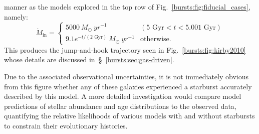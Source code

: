 manner as the models explored in the top row of Fig.~\ref{bursts:fig:fiducial_cases}, 
namely: 
\begin{equation} 
\dot{M}_\text{in} = \begin{cases} 
5000\ M_\odot\ yr^{-1} & (5\text{ Gyr} < t < 5.001\text{ Gyr}) \\ 
9.1e^{-t / (\text{2 Gyr})}\ M_\odot\ yr^{-1} & \text{otherwise}. 
\end{cases} 
\label{bursts:eq:kirby2010_burst_model}
\end{equation} 
This produces the jump-and-hook trajectory seen in Fig.~\ref{bursts:fig:kirby2010} 
whose details are discussed in~\S~\ref{bursts:sec:gas-driven}. 
\par 
Due to the associated observational uncertainties, it is not immediately 
obvious from this figure whether any of these galaxies experienced a starburst 
accurately described by this model. A more detailed investigation would 
compare model predictions of stellar abundance and age distributions to the 
observed data, quantifying the relative likelihoods of various models with and 
without starbursts to constrain their evolutionary histories. 
